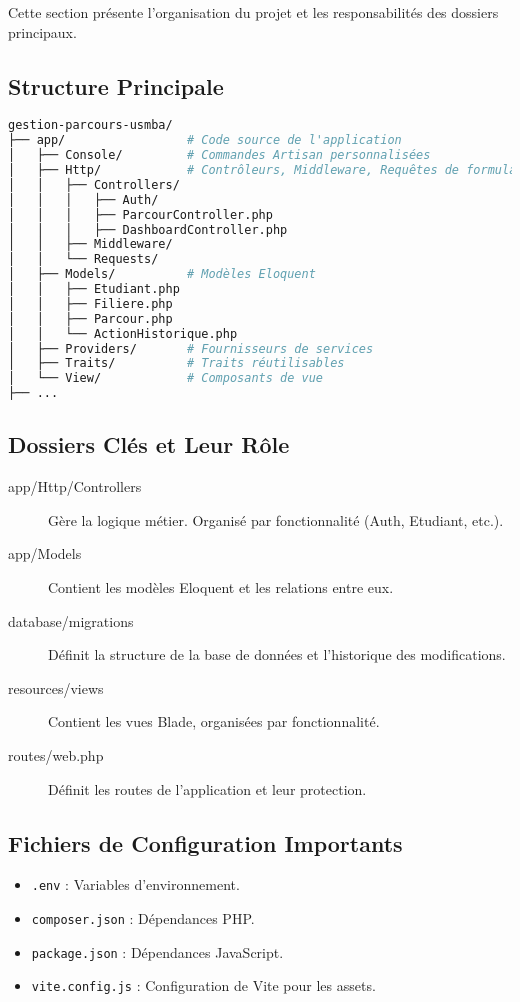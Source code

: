 \documentclass[12pt,a4paper]{report}
\begin{document}
Cette section présente l'organisation du projet et les responsabilités des dossiers principaux.

\subsection{Structure Principale}
\begin{lstlisting}[language=bash]
gestion-parcours-usmba/
├── app/                 # Code source de l'application
│   ├── Console/         # Commandes Artisan personnalisées
│   ├── Http/            # Contrôleurs, Middleware, Requêtes de formulaire
│   │   ├── Controllers/
│   │   │   ├── Auth/
│   │   │   ├── ParcourController.php
│   │   │   ├── DashboardController.php
│   │   ├── Middleware/
│   │   └── Requests/
│   ├── Models/          # Modèles Eloquent
│   │   ├── Etudiant.php
│   │   ├── Filiere.php
│   │   ├── Parcour.php
│   │   └── ActionHistorique.php
│   ├── Providers/       # Fournisseurs de services
│   ├── Traits/          # Traits réutilisables
│   └── View/            # Composants de vue
├── ...
\end{lstlisting}

\subsection{Dossiers Clés et Leur Rôle}
\begin{description}
    \item[app/Http/Controllers] Gère la logique métier. Organisé par fonctionnalité (Auth, Etudiant, etc.).
    \item[app/Models] Contient les modèles Eloquent et les relations entre eux.
    \item[database/migrations] Définit la structure de la base de données et l'historique des modifications.
    \item[resources/views] Contient les vues Blade, organisées par fonctionnalité.
    \item[routes/web.php] Définit les routes de l'application et leur protection.
\end{description}

\subsection{Fichiers de Configuration Importants}
\begin{itemize}
    \item \texttt{.env} : Variables d'environnement.
    \item \texttt{composer.json} : Dépendances PHP.
    \item \texttt{package.json} : Dépendances JavaScript.
    \item \texttt{vite.config.js} : Configuration de Vite pour les assets.
\end{itemize}
\end{document}
